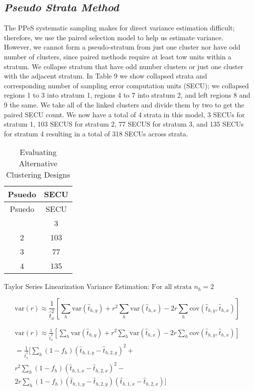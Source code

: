 \documentclass[
  12pt]{article}
\begin{document}
\hfill\break

\subsection{\texorpdfstring{\emph{Pseudo Strata
Method}}{Pseudo Strata Method}}\label{pseudo-strata-method}

The PPeS systematic sampling makes for direct variance estimation
difficult; therefore, we use the paired selection model to help us
estimate variance. However, we cannot form a pseudo-stratum from just
one cluster nor have odd number of clusters, since paired methods
require at least tow units within a stratum. We collapse stratum that
have odd number clusters or just one cluster with the adjacent stratum.
In Table 9 we show collapsed strata and corresponding number of sampling
error computation units (SECU); we collapsed regions 1 to 3 into stratum
1, regions 4 to 7 into stratum 2, and left regions 8 and 9 the same. We
take all of the linked clusters and divide them by two to get the paired
SECU count. We now have a total of 4 strata in this model, 3 SECUs for
stratum 1, 103 SECUS for stratum 2, 77 SECUS for stratum 3, and 135
SECUs for stratum 4 resulting in a total of 318 SECUs across strata.

\begin{longtable}[]{@{}cc@{}}
\caption{Evaluating Alternative Clustering Designs}\tabularnewline
\toprule\noalign{}
Psuedo & SECU \\
\midrule\noalign{}
\endfirsthead
\toprule\noalign{}
Psuedo & SECU \\
\midrule\noalign{}
\endhead
\bottomrule\noalign{}
\endlastfoot
1 & 3 \\
2 & 103 \\
3 & 77 \\
4 & 135 \\
\end{longtable}

Taylor Series Linearization Variance Estimation:
\(\text{For all strata } n_h = 2\)

\[
\text{var}(r) \approx \frac{1}{\hat{t}_x^2} \left[ \sum_h \text{var}(\hat{t}_{h,y}) + r^2 \sum_h \text{var}(\hat{t}_{h,x}) - 2r \sum_h \text{cov}(\hat{t}_{h,y}, \hat{t}_{h,x}) \right]
\]

\begin{align*}
   \text{var}(r) \approx \frac{1}{\hat{t}_x^2} \left[ \sum_h \text{var}(\hat{t}_{h,y}) + r^2 \sum_h      \text{var}(\hat{t}_{h,x}) - 2r \sum_h \text{cov}(\hat{t}_{h,y}, \hat{t}_{h,x}) \right] \\
   = \frac{1}{\hat{t}_x^2}  \Biggr[  \sum_h (1 - f_h)(\hat{t}_{h,1,y} - \hat{t}_{h,2,y})^2 + \\
r^2 \sum_h (1 - f_h)(\hat{t}_{h,1,x} - \hat{t}_{h,2,x})^2 - \\
2r \sum_h (1 - f_h)(\hat{t}_{h,1,y} - \hat{t}_{h,2,y})(\hat{t}_{h,1,x} - \hat{t}_{h,2,x}) \Biggr]
\end{align*}
\end{document}
